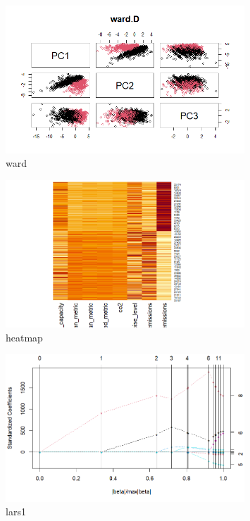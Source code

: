 \documentclass{article}
\begin{document}
\begin{figure}[h!]
        \centering
        \includegraphics[width=0.8\textwidth]{../plots/ward.png}
        \caption{ward}
        \label{fig:ward}
\end{figure}    

\begin{figure}[h!]
        \centering
        \includegraphics[width=0.8\textwidth]{../plots/heatmap.png}
        \caption{heatmap}
        \label{fig:heatmap}
\end{figure}

\begin{figure}[h!]
        \centering
        \includegraphics[width=0.8\textwidth]{../plots/lars1.png}
        \caption{lars1}
        \label{fig:lars1}
\end{figure}
\end{document}
